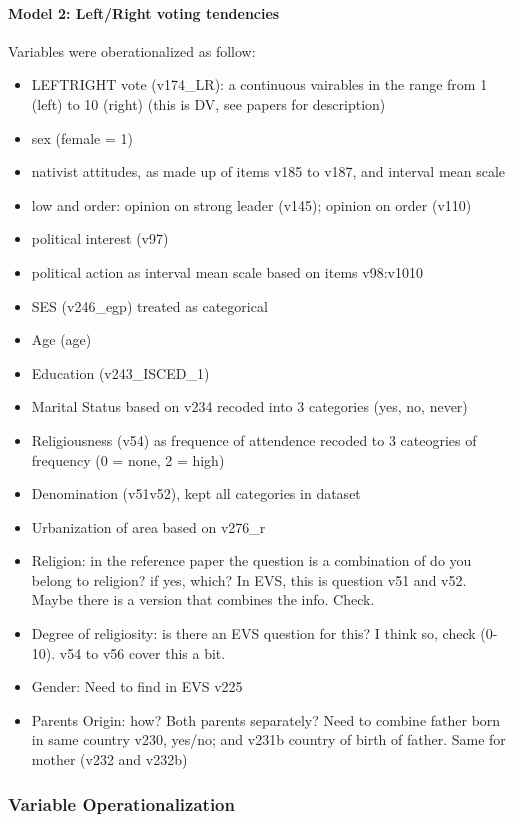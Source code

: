 \paragraph{Model 2: Left/Right voting tendencies}

Variables were oberationalized as follow:
\begin{itemize}
	\item LEFT\/RIGHT vote (v174\_LR): a continuous vairables in the range from 1 (left) to 10 (right)
		(this is DV, see papers for description)
	\item sex (female = 1)
	\item nativist attitudes, as made up of items v185 to v187, and interval mean scale
	\item low and order: opinion on strong leader (v145); opinion on order (v110)
	\item political interest (v97)
	\item political action as interval mean scale based on items v98:v1010
	\item SES (v246\_egp) treated as categorical
	\item Age (age) 
	\item Education (v243\_ISCED\_1)
	\item Marital Status based on v234 recoded into 3 categories (yes, no, never)
	\item Religiousness (v54) as frequence of attendence recoded to 3 cateogries of frequency (0 = none, 2 = high)
	\item Denomination (v51v52), kept all categories in dataset
	\item Urbanization of area based on v276\_r		
	\item Religion: in the reference paper the question is a combination of do you belong to religion? if yes, which?
		In EVS, this is question v51 and v52. Maybe there is a version that combines the info. Check.
	\item Degree of religiosity: is there an EVS question for this? I think so, check (0-10). v54 to v56 cover this a bit.
	\item Gender: Need to find in EVS v225
	\item Parents Origin: how? Both parents separately? Need to combine father born in same country v230, yes/no; and 
		v231b country of birth of father. Same for mother (v232 and v232b)
\end{itemize}

\subsubsection{Variable Operationalization}

